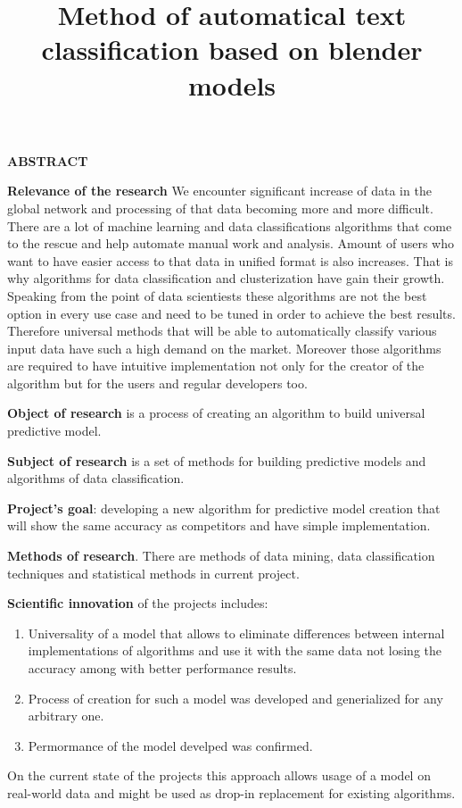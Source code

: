 \documentclass[a4paper,14pt]{extarticle}
\begin{document}
\title{Method of automatical text classification based on blender models}

\begin{center}
	\textbf{\uppercase{Abstract}}
\end{center}

\textbf{Relevance of the research} We encounter significant increase of data in the global network and processing of that data becoming more and more difficult. There are a lot of machine learning and data classifications algorithms that come to the rescue and help automate manual work and analysis. Amount of users who want to have easier access to that data in unified format is also increases. That is why algorithms for data classification and clusterization have gain their growth. Speaking from the point of data scientiests these algorithms are not the best option in every use case and need to be tuned in order to achieve the best results. Therefore universal methods that will be able to automatically classify various input data have such a high demand on the market. Moreover those algorithms are required to have intuitive implementation not only for the creator of the algorithm but for the users and regular developers too.

\textbf{Object of research} is a process of creating an algorithm to build universal predictive model.

\textbf{Subject of research} is a set of methods for building predictive models and algorithms of data classification.

\textbf{Project's goal}: developing a new algorithm for predictive model creation that will show the same accuracy as competitors and have simple implementation.

\textbf{Methods of research}. There are methods of data mining, data classification techniques and statistical methods in current project.

\textbf{Scientific innovation} of the projects includes:

\begin{enumerate}
	\item Universality of a model that allows to eliminate differences between internal implementations of algorithms and use it with the same data not losing the accuracy among with better performance results.
	\item Process of creation for such a model was developed and generialized for any arbitrary one.
	\item Permormance of the model develped was confirmed.
\end{enumerate}
On the current state of the projects this approach allows usage of a model on real-world data and might be used as drop-in replacement for existing algorithms.
\end{document}
